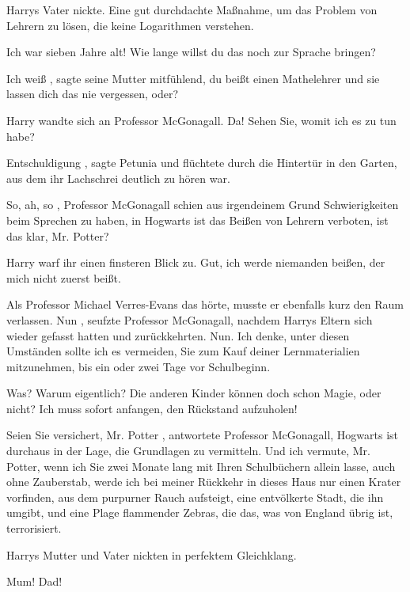 Harrys Vater nickte. \glqq Eine gut durchdachte Maßnahme, um das Problem von
Lehrern zu lösen, die keine Logarithmen verstehen.\grqq{}

\glqq Ich war sieben Jahre alt! Wie lange willst du das noch zur Sprache
bringen?\grqq{}

\glqq Ich weiß\grqq{} , sagte seine Mutter mitfühlend, \glqq du beißt einen Mathelehrer
und sie lassen dich das nie vergessen, oder?\grqq{}

Harry wandte sich an Professor McGonagall. \glqq Da! Sehen Sie, womit ich es zu
tun habe?\grqq{}

\glqq Entschuldigung\grqq{} , sagte Petunia und flüchtete durch die Hintertür in den
Garten, aus dem ihr Lachschrei deutlich zu hören war.

\glqq So, ah, so\grqq{} , Professor McGonagall schien aus irgendeinem Grund
Schwierigkeiten beim Sprechen zu haben, \glqq in Hogwarts ist das Beißen von
Lehrern verboten, ist das klar, Mr. Potter?\grqq{}

Harry warf ihr einen finsteren Blick zu. \glqq Gut, ich werde niemanden beißen,
der mich nicht zuerst beißt.\grqq{}

Als Professor Michael Verres-Evans das hörte, musste er ebenfalls kurz den Raum
verlassen. \glqq Nun\grqq{} , seufzte Professor McGonagall, nachdem Harrys Eltern sich
wieder gefasst hatten und zurückkehrten. \glqq Nun. Ich denke, unter diesen
Umständen sollte ich es vermeiden, Sie zum Kauf deiner Lernmaterialien
mitzunehmen, bis ein oder zwei Tage vor Schulbeginn.\grqq{}

\glqq Was? Warum eigentlich? Die anderen Kinder können doch schon Magie, oder
nicht? Ich muss sofort anfangen, den Rückstand aufzuholen!\grqq{}

\glqq Seien Sie versichert, Mr. Potter\grqq{} , antwortete Professor McGonagall, \glqq
Hogwarts ist durchaus in der Lage, die Grundlagen zu vermitteln. Und ich
vermute, Mr. Potter, wenn ich Sie zwei Monate lang mit Ihren Schulbüchern allein
lasse, auch ohne Zauberstab, werde ich bei meiner Rückkehr in dieses Haus nur
einen Krater vorfinden, aus dem purpurner Rauch aufsteigt, eine entvölkerte
Stadt, die ihn umgibt, und eine Plage flammender Zebras, die das, was von
England übrig ist, terrorisiert.\grqq{}

Harrys Mutter und Vater nickten in perfektem Gleichklang.

\glqq Mum! Dad! \glqq